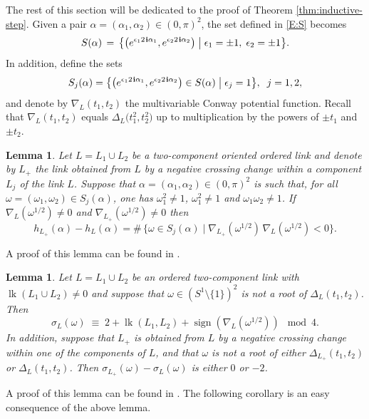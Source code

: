\documentclass[11pt,reqno]{amsart}
\newtheorem{lemma}[theorem]{Lemma}
\theoremstyle{definition}
\renewcommand{\i}{\mspace{1.5mu}\mathbf i}
\newcommand{\lk}{\operatorname{lk}}
\newcommand{\sign}{\operatorname{sign}}
\begin{document}
\begin{sloppypar}
The rest of this section will be dedicated to the proof of Theorem \ref{thm:inductive-step}. Given a pair $\alpha = (\alpha_1,\alpha_2) \in (0,\pi)^2$, the set defined in \eqref{E:S} becomes 
\[
S(\alpha)\, =\, \big\lbrace \big(e^{\epsilon_1 2\i\alpha_1}, e^{\epsilon_2 2\i\alpha_2}\big) \; \big| \; \epsilon_1 = \pm 1,\; \epsilon_2 = \pm 1 \big\rbrace.
\]
In addition, define the sets 
\[
S_j(\alpha) = \big\lbrace \big(e^{\epsilon_1 2\i\alpha_1}, e^{\epsilon_2 2\i\alpha_2}\big) \in S(\alpha) \; \big| \; \epsilon_j = 1 \big\rbrace,\;\; j = 1, 2,
\]
and denote by $\nabla_L (t_1,t_2)$ the multivariable Conway potential function. Recall that $\nabla_L (t_1, t_2)$ equals $\Delta_L \big(t_1^2, t_2^2\big)$ up to multiplication by the powers of $\pm t_1$ and $\pm t_2$.

\begin{lemma}
Let $L = L_1 \cup L_2$ be a two-component oriented ordered link and denote by $L_+$ the link obtained from $L$ by a negative crossing change within a component $L_j$ of the link $L$. Suppose that $\alpha = (\alpha_1, \alpha_2) \in (0, \pi)^2$ is such that, for all $\omega = (\omega_1, \omega_2) \in S_j(\alpha)$, one has $\omega_1^2 \ne 1$, $\omega_1^2 \ne 1$ and $\omega_1\omega_2 \ne 1$. If $\nabla_L(\omega^{1/2}) \ne 0$ and $\nabla_{L_+}(\omega^{1/2}) \ne 0$ then
\[
h_{L_+}(\alpha) - h_L(\alpha) = \#\, \big\lbrace \omega \in S_j(\alpha) \; \big| \; \nabla_{L_+}(\omega^{1/2})\, \nabla_L(\omega^{1/2}) < 0\big\rbrace.
\]
\end{lemma}
	
A proof of this lemma can be found in \cite[Proposition 5.10 and Remark 5.11]{Benard-Conway}.
	
\begin{lemma}
Let $L = L_1 \cup L_2$ be an ordered two-component link with $\lk(L_1\cup L_2) \neq 0$ and suppose that $\omega \in (S^1 \setminus \lbrace 1 \rbrace)^2$ is not a root of $\Delta_L(t_1,t_2)$. Then
\[
\sigma_L(\omega)\; \equiv\; 2 + \lk(L_1, L_2) + \sign(\nabla_L(\omega^{1/2})) \; \bmod{4}.
\]
In addition, suppose that $L_+$ is obtained from $L$ by a negative crossing change within one of the components of $L$, and that $\omega$ is not a root of either $\Delta_{L_+}(t_1,t_2)$ or $\Delta_L(t_1,t_2)$. Then $\sigma_{L_+}(\omega) - \sigma_L(\omega)$ is either $0$ or $-2$.
\end{lemma}

A proof of this lemma can be found in \cite[Lemma 6.2]{Benard-Conway}. The following corollary is an easy consequence of the above lemma.
	

\end{sloppypar}
\end{document}

